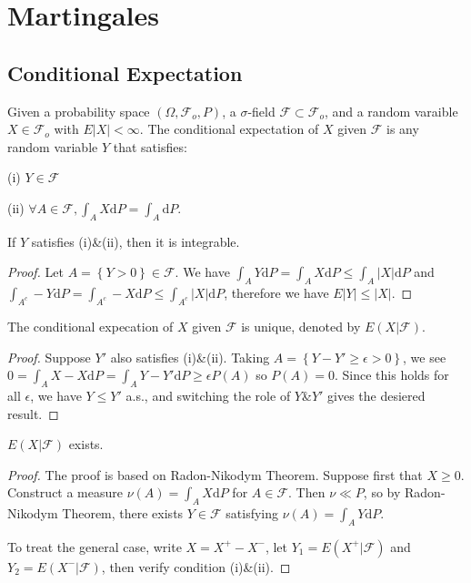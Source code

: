 
\chapter{Martingales}
\section{Conditional Expectation}
\begin{definition}
Given a probability space $(\Omega,\mathcal{F}_o,P)$, a $\sigma$-field $\mathcal{F}\subset\mathcal{F}_o$, and a random varaible $X\in\mathcal{F}_o$ with $E\left|X\right|<\infty$. The conditional expectation of $X$ given $\mathcal{F}$ is any random variable $Y$ that satisfies:\par
(i) $Y\in\mathcal{F}$\par
(ii) $\forall A\in\mathcal{F},\int_AX\mathrm{d}P=\int_A\mathrm{d}P$.
\end{definition}
\begin{lemma}
If $Y$ satisfies (i)\&(ii), then it is integrable.
\end{lemma}
\begin{proof}
Let $A=\left \{ Y>0 \right \} \in \mathcal{F}$. We have $\int_AY\mathrm{d}P=\int_AX\mathrm{d}P\le\int_A\left | X \right | \mathrm{d}P$ and $\int_{A^c}-Y\mathrm{d}P=\int_{A^c}-X\mathrm{d}P\le \int_{A^c}\left | X \right | \mathrm{d}P$, therefore we have $E\left |Y \right | \le\left | X \right | $.
\end{proof}
\begin{theorem}
The conditional expecation of $X$ given $\mathcal{F}$ is unique, denoted by $E(X|\mathcal{F})$.
\end{theorem}
\begin{proof}
Suppose $Y'$ also satisfies (i)\&(ii). Taking $A=\left \{ Y-Y'\geq\epsilon>0 \right \} $, we see $0=\int_AX-X\mathrm{d}P=\int_AY-Y'\mathrm{d}P\geq\epsilon P(A)$ so $P(A)=0$. Since this holds for all $\epsilon$, we have $Y\le Y'$ a.s., and switching the role of $Y$\&$Y'$ gives the desiered result.
\end{proof}
\begin{theorem}
$E(X|\mathcal{F})$ exists.
\end{theorem}
\begin{proof}
The proof is based on Radon-Nikodym Theorem. Suppose first that $X\geq 0$. Construct  a measure $\nu(A)=\int_AX\mathrm{d}P$ for $A\in\mathcal{F}$. Then $\nu\ll P$, so by Radon-Nikodym Theorem, there exists $Y\in\mathcal{F}$ satisfying $\nu(A)=\int_AY\mathrm{d}P$.\par
To treat the general case, write $X=X^+-X^-$, let $Y_1=E(X^+|\mathcal{F})$ and $Y_2=E(X^-|\mathcal{F})$, then verify condition (i)\&(ii).
\end{proof}
